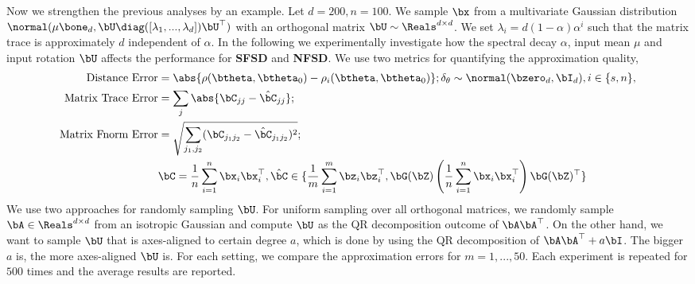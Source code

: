 Now we strengthen the previous analyses by an example. Let $d=200, n=100$. We sample $\bx$  from a multivariate Gaussian distribution $ \normal(\mu \bone_d, \bU \diag([\lambda_1, ..., \lambda_d]) \bU^{\top})$ with an orthogonal matrix $\bU \sim \Reals^{d \times d}$. We set $\lambda_i = d(1-\alpha) \alpha^i$ such that the matrix trace is approximately $d$ independent of $\alpha$. In the following we experimentally investigate how the spectral decay $\alpha$, input mean $\mu$ and input rotation $\bU$ affects the performance for \textbf{SFSD} and \textbf{NFSD}. We use two metrics for quantifying the approximation quality,
\begin{align}
    \text{Distance Error} &= \abs{\rho(\btheta, \btheta_0) - \rho_i(\btheta, \btheta_0)}; \delta_{\theta} \sim \normal(\bzero_d, \bI_d),i \in \{s, n\},  \\
    \text{Matrix Trace Error} &= \sum_j \abs{\bC_{jj} - \hat{\bC}_{jj}}; \\
    \text{Matrix Fnorm Error} &= \sqrt{\sum_{j_1, j_2} (\bC_{j_1 j_2} - \hat{\bC}_{j_1 j_2})^2} ; \\
    & \bC = \frac{1}{n}\sum_{i=1}^n \bx_i \bx_i^{\top},  \hat{\bC} \in \{\frac{1}{m}\sum_{i=1}^m \bz_i \bz_i^{\top}, \bG(\bZ)\left( \frac{1}{n}\sum_{i=1}^n \bx_i \bx_i^{\top} \right) \bG(\bZ)^{\top} \}  \notag 
\end{align}
We use two approaches for randomly sampling $\bU$. For uniform sampling over all orthogonal matrices, we randomly sample $\bA \in \Reals^{d \times d}$ from an isotropic Gaussian and compute $\bU$ as the QR decomposition outcome of $\bA \bA^{\top}$. On the other hand, we want to sample $\bU$ that is axes-aligned to certain degree $a$, which is done by using the QR decomposition of $\bA \bA^{\top} + a \bI$. The bigger $a$ is, the more axes-aligned $\bU$ is. For each setting, we compare the approximation errors for $m = 1,...,50$. Each experiment is repeated for $500$ times and the average results are reported.


